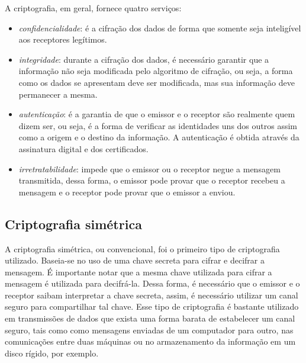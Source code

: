A criptografia, em geral, fornece quatro serviços: \cite{Portnoi:2005}

\begin{itemize}
\item \textit{confidencialidade}: é a cifração dos dados de forma que somente seja inteligível aos receptores legítimos.
\item \textit{integridade}: durante a cifração dos dados, é necessário garantir que a informação não seja modificada pelo algoritmo de cifração, ou seja, a forma como os dados se apresentam deve ser modificada, mas sua informação deve permanecer a mesma.
\item \textit{autenticação}: é a garantia de que o emissor e o receptor são realmente quem dizem ser, ou seja, é a forma de verificar as identidades uns dos outros assim como a origem e o destino da informação. A autenticação é obtida através da assinatura digital e dos certificados.
\item \textit{irretratabilidade}: impede que o emissor ou o receptor negue a mensagem transmitida, dessa forma, o emissor pode provar que o receptor recebeu a mensagem e o receptor pode provar que o emissor a enviou.
\end{itemize}

%
%
\subsection{Criptografia simétrica}
A criptografia simétrica, ou convencional, foi o primeiro tipo de criptografia utilizado. Baseia-se no uso de uma chave secreta para cifrar e decifrar a mensagem. É importante notar que a mesma chave utilizada para cifrar a mensagem é utilizada para decifrá-la. Dessa forma, é necessário que o emissor e o receptor saibam interpretar a chave secreta, assim, é necessário utilizar um canal seguro para compartilhar tal chave. Esse tipo de criptografia é bastante utilizado em transmissões de dados que exista uma forma barata de estabelecer um canal seguro, tais como como mensagens enviadas de um computador para outro, nas comunicações entre duas máquinas ou no armazenamento da informação em um disco rígido, por exemplo. \cite{Cavalcante:2015}

%
%
